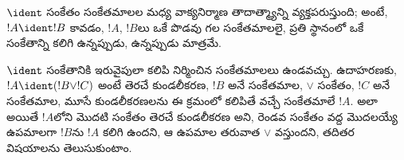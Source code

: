 \documentclass[../../../include/open-logic-section]{subfiles}
\begin{document}
\begin{defn}[వాక్యనిర్మాణ తాదాత్మ్యం]
$\ident$ సంకేతం సంకేతమాలల మధ్య వాక్యనిర్మాణ తాదాత్మ్యాన్ని
వ్యక్తపరుస్తుంది; అంటే, $!A \ident !B$ కావడం, $!A$, $!B$లు ఒకే
పొడవు గల సంకేతమాలలై, ప్రతి స్థానంలో ఒకే సంకేతాన్ని కలిగి
ఉన్నప్పుడు, ఉన్నప్పుడు మాత్రమే.
\end{defn}

$\ident$ సంకేతానికి ఇరువైపులా కలిపి నిర్మించిన సంకేతమాలలు
ఉండవచ్చు. ఉదాహరణకు, $!A \ident (!B \lor !C)$ అంటే తెరచే
కుండలీకరణ, $!B$ అనే సంకేతమాల, $\lor$ సంకేతం, $!C$ అనే
సంకేతమాల, మూసే కుండలీకరణలను ఈ క్రమంలో కలిపితే వచ్చే సంకేతమాలే
$!A$. అలా అయితే $!A$లోని మొదటి సంకేతం తెరచే కుండలీకరణ అని, రెండవ
సంకేతం వద్ద మొదలయ్యే ఉపమాలగా $!B$ను $!A$ కలిగి ఉందని, ఆ ఉపమాల
తరువాత $\lor$ వస్తుందని, తదితర విషయాలను తెలుసుకుంటాం.
\end{document}
